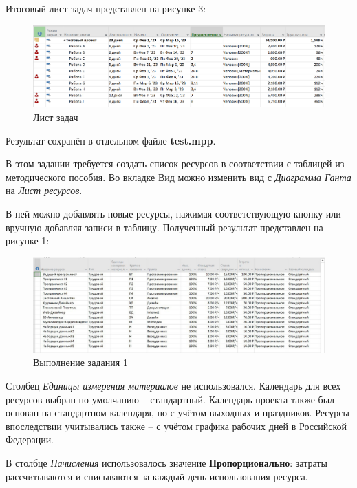 Итоговый лист задач представлен на рисунке 3:
\FloatBarrier
\begin{figure}[h]	
	\begin{center}
		\includegraphics[width=\linewidth]{inc/result.png}
	\end{center}
	\captionsetup{justification=centering}
	\caption{Лист задач}
\end{figure}
\FloatBarrier

Результат сохранён в отдельном файле \textbf{test.mpp}.
\newpage

В этом задании требуется создать список ресурсов в соответствии с таблицей из методического пособия.
Во вкладке Вид можно изменить вид с \textit{Диаграмма Ганта} на \textit{Лист ресурсов}.
 
В ней можно добавлять новые ресурсы, нажимая соответствующую кнопку или вручную добавляя записи в таблицу.
Полученный результат представлен на рисунке 1:
\FloatBarrier
\begin{figure}[h]	
	\begin{center}
		\includegraphics[width=\linewidth]{inc/1-1.jpeg}
	\end{center}
	\captionsetup{justification=centering}
	\caption{Выполнение задания 1}
\end{figure}
\FloatBarrier

Столбец \textit{Единицы измерения материалов} не использовался. 
Календарь для всех ресурсов выбран по-умолчанию – стандартный. 
Календарь проекта также был основан на стандартном календаря, но с учётом выходных и праздников.
Ресурсы впоследствии учитывались также – с учётом графика рабочих дней в Российской Федерации.

В столбце \textit{Начисления} использовалось значение \textbf{Пропорционально}: затраты рассчитываются и списываются за каждый день использования ресурса.

